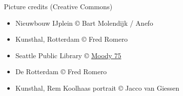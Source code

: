 \documentclass[aspectratio=169,12pt,usepdftitle=false]{beamer} %
\begin{document}
\begin{frame}{Picture credits (Creative Commons)}
    \begin{itemize}
	\item Nieuwbouw IJplein \copyright{} Bart Molendijk / Anefo
	\item Kunsthal, Rotterdam \copyright{} Fred Romero
	\item Seattle Public Library \copyright{} \href{https://www.flickr.com/people/moody75/}{Moody 75}
	\item De Rotterdam \copyright{} Fred Romero
	\item Kunsthal, Rem Koolhaas portrait \copyright{} Jacco van Giessen
    \end{itemize}
\end{frame}
\end{document}
